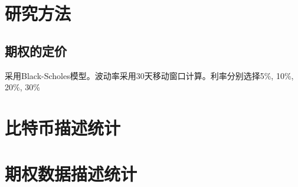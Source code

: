 \documentclass[UTF8]{ctexart}
\begin{document}
\section{研究方法}
    \subsection{期权的定价}
    采用Black-Scholes模型。波动率采用30天移动窗口计算。利率分别选择5\%, 10\%, 20\%, 30\%

\section{比特币描述统计}


\section{期权数据描述统计}

\end{document}
